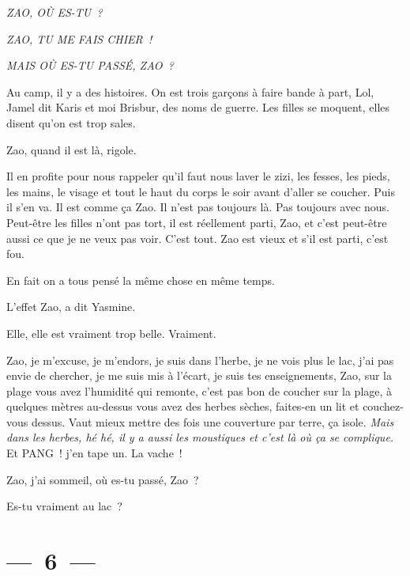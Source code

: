 \documentclass[french,twoside]{book} %
\begin{document}
{\itshape ZAO, OÙ ES-TU ?}\par
{\itshape ZAO, TU ME FAIS CHIER !}\par
{\itshape MAIS OÙ ES-TU PASSÉ, ZAO ?}\par
\bigbreak
\noindent Au camp, il y a des histoires. On est trois garçons à faire bande à part, Lol, Jamel dit Karis et moi Brisbur, des noms de guerre. Les filles se moquent, elles disent qu’on est trop sales.\par
Zao, quand il est là, rigole.\par
Il en profite pour nous rappeler qu’il faut nous laver le zizi, les fesses, les pieds, les mains, le visage et tout le haut du corps le soir avant d’aller se coucher. Puis il s’en va. Il est comme ça Zao. Il n’est pas toujours là. Pas toujours avec nous. Peut-être les filles n’ont pas tort, il est réellement parti, Zao, et c’est peut-être aussi ce que je ne veux pas voir. C’est tout. Zao est vieux et s’il est parti, c’est fou.\par
\bigbreak
En fait on a tous pensé la même chose en même temps.\par
L’effet Zao, a dit Yasmine.\par
Elle, elle est vraiment trop belle. Vraiment.\par
Zao, je m’excuse, je m’endors, je suis dans l’herbe, je ne vois plus le lac, j’ai pas envie de chercher, je me suis mis à l’écart, je suis tes enseignements, Zao, sur la plage vous avez l’humidité qui remonte, c’est pas bon de coucher sur la plage, à quelques mètres au-dessus vous avez des herbes sèches, faites-en un lit et couchez-vous dessus. Vaut mieux mettre des fois une couverture par terre, ça isole. \emph{Mais dans les herbes, hé hé, il y a aussi les moustiques et c’est là où ça se complique.} Et PANG ! j’en tape un. La vache !\par
\bigbreak
Zao, j’ai sommeil, où es-tu passé, Zao ?\par
Es-tu vraiment au lac ?

\section[{— 6 —}]{— 6 —}
\renewcommand{\leftmark}{— 6 —}
\end{document}
